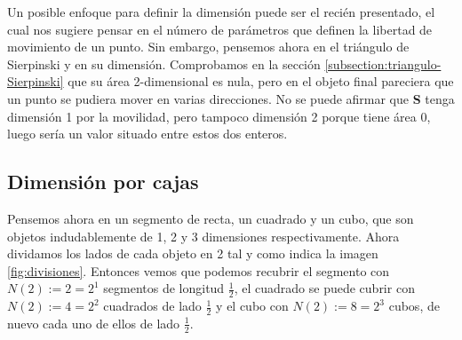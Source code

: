 Un posible enfoque para definir la dimensión puede ser el recién presentado, el cual nos sugiere pensar en el número de parámetros que definen la libertad de movimiento de un punto. Sin embargo, pensemos ahora en el triángulo de Sierpinski y en su dimensión. Comprobamos en la sección \ref{subsection:triangulo-Sierpinski} que su área 2-dimensional es nula, pero en el objeto final pareciera que un punto se pudiera mover en varias direcciones. No se puede afirmar que \textbf{S} tenga dimensión 1 por la movilidad, pero tampoco dimensión 2 porque tiene área 0, luego sería un valor situado entre estos dos enteros.

\subsection{Dimensión por cajas}
\label{subsection:dim-cajas}

Pensemos ahora en un segmento de recta, un cuadrado y un cubo, que son objetos indudablemente de 1, 2 y 3 dimensiones respectivamente. Ahora dividamos los lados de cada objeto en 2 tal y como indica la imagen \ref{fig:divisiones}. Entonces vemos que podemos recubrir el segmento con $N(2):=2=2^1$ segmentos de longitud $\frac{1}{2}$, el cuadrado se puede cubrir con $N(2):=4=2^2$ cuadrados de lado $\frac{1}{2}$ y el cubo con $N(2):=8=2^3$ cubos, de nuevo cada uno de ellos de lado $\frac 1 2$.

